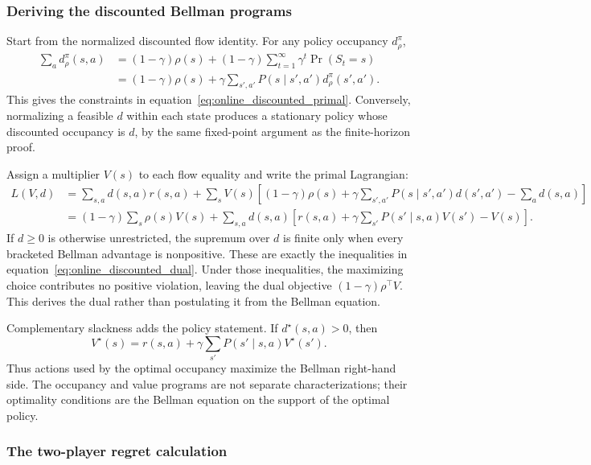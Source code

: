 \subsubsection{Deriving the discounted Bellman programs}

Start from the normalized discounted flow identity. For any policy occupancy $d^\pi_\rho$,
\begin{align}
\sum_a d^\pi_\rho(s,a)
&=(1-\gamma)\rho(s)
+(1-\gamma)\sum_{t=1}^\infty\gamma^t\Pr(S_t=s) \nonumber\\
&=(1-\gamma)\rho(s)
+\gamma\sum_{s',a'}P(s\mid s',a')d^\pi_\rho(s',a').
\label{eq:online_discounted_flow_derivation}
\end{align}
This gives the constraints in equation~\eqref{eq:online_discounted_primal}. Conversely, normalizing a feasible $d$ within each state produces a stationary policy whose discounted occupancy is $d$, by the same fixed-point argument as the finite-horizon proof.

Assign a multiplier $V(s)$ to each flow equality and write the primal Lagrangian:
\begin{align}
L(V,d)
&=
\sum_{s,a}d(s,a)r(s,a)
+\sum_sV(s)\left[(1-\gamma)\rho(s)
+\gamma\sum_{s',a'}P(s\mid s',a')d(s',a')
-\sum_a d(s,a)\right] \nonumber\\
&=
(1-\gamma)\sum_s\rho(s)V(s)
+\sum_{s,a}d(s,a)
\left[r(s,a)+\gamma\sum_{s'}P(s'\mid s,a)V(s')-V(s)\right].
\label{eq:online_bellman_lagrangian_derivation}
\end{align}
If $d\geq0$ is otherwise unrestricted, the supremum over $d$ is finite only when every bracketed Bellman advantage is nonpositive. These are exactly the inequalities in equation~\eqref{eq:online_discounted_dual}. Under those inequalities, the maximizing choice contributes no positive violation, leaving the dual objective $(1-\gamma)\rho^\top V$. This derives the dual rather than postulating it from the Bellman equation.

Complementary slackness adds the policy statement. If $d^\star(s,a)>0$, then
\[
V^\star(s)=r(s,a)+\gamma\sum_{s'}P(s'\mid s,a)V^\star(s').
\]
Thus actions used by the optimal occupancy maximize the Bellman right-hand side. The occupancy and value programs are not separate characterizations; their optimality conditions are the Bellman equation on the support of the optimal policy.

\subsubsection{The two-player regret calculation}

